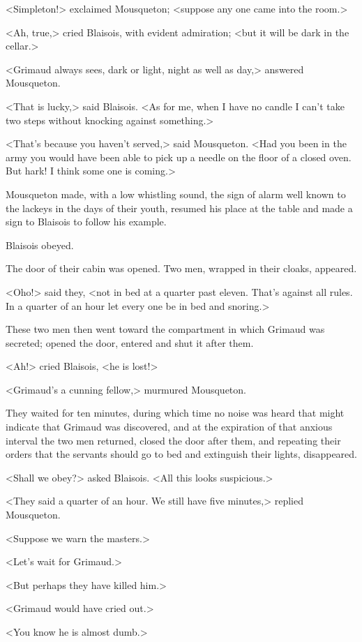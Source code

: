 <Simpleton!> exclaimed Mousqueton; <suppose any one came into the room.>

<Ah, true,> cried Blaisois, with evident admiration; <but it will be dark in the cellar.>

<Grimaud always sees, dark or light, night as well as day,> answered Mousqueton.

<That is lucky,> said Blaisois. <As for me, when I have no candle I can't take two steps without knocking against something.>

<That's because you haven't served,> said Mousqueton. <Had you been in the army you would have been able to pick up a needle on the floor of a closed oven. But hark! I think some one is coming.>

Mousqueton made, with a low whistling sound, the sign of alarm well known to the lackeys in the days of their youth, resumed his place at the table and made a sign to Blaisois to follow his example.

Blaisois obeyed.

The door of their cabin was opened. Two men, wrapped in their cloaks, appeared.

<Oho!> said they, <not in bed at a quarter past eleven. That's against all rules. In a quarter of an hour let every one be in bed and snoring.>

These two men then went toward the compartment in which Grimaud was secreted; opened the door, entered and shut it after them.

<Ah!> cried Blaisois, <he is lost!>

<Grimaud's a cunning fellow,> murmured Mousqueton.

They waited for ten minutes, during which time no noise was heard that might indicate that Grimaud was discovered, and at the expiration of that anxious interval the two men returned, closed the door after them, and repeating their orders that the servants should go to bed and extinguish their lights, disappeared.

<Shall we obey?> asked Blaisois. <All this looks suspicious.>

<They said a quarter of an hour. We still have five minutes,> replied Mousqueton.

<Suppose we warn the masters.>

<Let's wait for Grimaud.>

<But perhaps they have killed him.>

<Grimaud would have cried out.>

<You know he is almost dumb.>

